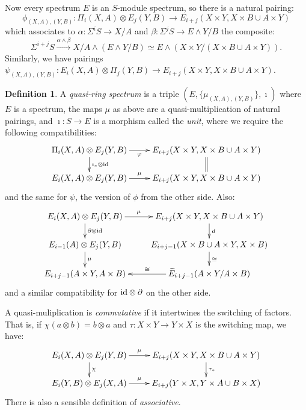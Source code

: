 \documentclass[11pt]{article}
\theoremstyle{plain}
\theoremstyle{definition}
\newtheorem{defn}[thm]{Definition}
\begin{document}
Now every spectrum $E$ is an $S$-module spectrum, so there is a natural pairing:
\[\phi_{(X,A),(Y,B)}:\Pi_i(X,A)\otimes E_j(Y,B)\to E_{i+j}(X\times Y,X\times
B\cup A\times Y)\]
which associates to $\alpha:\Sigma^iS\to X/A$ and
$\beta:\Sigma^jS\to E\wedge Y/B$ the composite:%
\[\Sigma^{i+j}S\xrightarrow{\alpha\wedge\beta}X/A\wedge(E\wedge
Y/B)\simeq E\wedge(X\times Y/(X\times B\cup A\times
Y)).\]
Similarly, we have pairings $\psi_{(X,A),(Y,B)}:E_i(X,A)\otimes \Pi_j(Y,B)\to
E_{i+j}(X\times Y,X\times B\cup A\times Y)$.
\begin{defn}
A \emph{quasi-ring spectrum} is a triple $(E,\{\mu_{(X,A),(Y,B)}\},\imath)$
where $E$ is a spectrum, the maps $\mu$ as above are a quasi-multiplication of
natural pairings, and $\imath:S\to E$ is a morphism called the \emph{unit},
where we require the following compatibilities:
\[\xymatrix@R=.6cm{
\Pi_i(X,A)\otimes E_j(Y,B)\ar[r]_{\phi\qquad}\ar[d]^{\imath_*\otimes\id}&
E_{i+j}(X\times Y,X\times B\cup A\times Y)\ar@{=}[d]\\
E_i(X,A)\otimes E_j(Y,B)\ar[r]^{\mu\qquad}&
E_{i+j}(X\times Y,X\times B\cup A\times Y)\\
}\]
and the same for $\psi$, the version of $\phi$ from the other side. Also:
\[\xymatrix@R=.6cm{
E_i(X,A)\otimes E_j(Y,B)\ar[r]^{\mu\qquad}\ar[d]^{\partial\otimes\id}&
E_{i+j}(X\times Y,X\times B\cup A\times Y)\ar[d]^d\\
E_{i-1}(A)\otimes E_j(Y,B)\ar[d]^{\mu\qquad}&
E_{i+j-1}(X\times B\cup A\times Y,X\times B)\ar[d]^\cong\\
E_{i+j-1}(A\times Y,A\times B)&
\widetilde E_{i+j-1}(A\times Y/A\times B)\ar[l]_\cong
}\]
and a similar compatibility for $\textup{id}\otimes\partial$ on the other side.

A quasi-muliplication is \emph{commutative} if it intertwines the switching of
factors. That is, if $\chi(a\otimes b)=b\otimes a$ and $\tau:X\times Y\to
Y\times X$ is the switching map, we have:
\[\xymatrix@R=.6cm{
E_i(X,A)\otimes E_j(Y,B)\ar[r]^{\mu\qquad}\ar[d]^{\chi}&
E_{i+j}(X\times Y,X\times B\cup A\times Y)\ar[d]^{\tau_*}\\
E_i(Y,B)\otimes E_j(X,A)\ar[r]^{\mu\qquad}&
E_{i+j}(Y\times X,Y\times A\cup B\times X)
}\]
There is also a sensible definition of \emph{associative}.


\end{defn}
\end{document}
